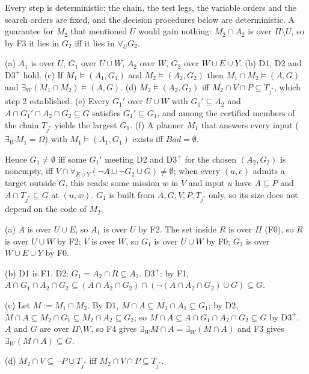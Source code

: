 \documentclass[10pt]{article}
\newcommand{\sect}[1]{\par\smallskip{\large\bfseries #1}\par\smallskip}
\newcommand{\ex}{\exists}
\newcommand{\fa}{\forall}
\newcommand{\Dthree}{\mathrm{D3}^{+}}
\begin{document}
Every step is deterministic: the chain, the test legs, the variable orders and the search orders are fixed, and the decision procedures below are deterministic. A guarantee for $M_2$ that mentioned $U$ would gain nothing: $M_2\cap A_2$ is over $\Pi\setminus U$, so by F3 it lies in $G_2$ iff it lies in $\fa_U G_2$.

\sect{3\quad Theorem}

(a) $A_1$ is over $U$, $G_1$ over $U\cup W$, $A_2$ over $W$, $G_2$ over $W\cup E\cup Y$. (b) D1, D2 and $\Dthree$ hold. (c) If $M_1\models(A_1,G_1)$ and $M_2\models(A_2,G_2)$ then $M_1\cap M_2\models(A,G)$ and $\ex_W(M_1\cap M_2)\models(A,G)$. (d) $M_2\models(A_2,G_2)$ iff $M_2\cap V\cap P\subseteq T_{j^*}$, which step 2 established. (e) Every $G_1'$ over $U\cup W$ with $G_1'\subseteq A_2$ and $A\cap G_1'\cap A_2\cap G_2\subseteq G$ satisfies $G_1'\subseteq G_1$, and among the certified members of the chain $T_{j^*}$ yields the largest $G_1$. (f) A planner $M_1$ that answers every input ($\ex_W M_1=\Omega$) with $M_1\models(A_1,G_1)$ exists iff $\mathit{Bad}=\emptyset$.

Hence $G_1\neq\emptyset$ iff some $G_1'$ meeting D2 and $\Dthree$ for the chosen $(A_2,G_2)$ is nonempty, iff $V\cap\fa_{E\cup Y}(\lnot A\cup\lnot G_2\cup G)\neq\emptyset$; when every $(u,e)$ admits a target outside $G$, this reads: some mission $w$ in $V$ and input $u$ have $A\subseteq P$ and $A\cap T_{j^*}\subseteq G$ at $(u,w)$. $G_1$ is built from $A,G,V,P,T_{j^*}$ only, so its size does not depend on the code of $M_2$.

\sect{4\quad Proof}

(a) $A$ is over $U\cup E$, so $A_1$ is over $U$ by F2. The set inside $R$ is over $\Pi$ (F0), so $R$ is over $U\cup W$ by F2; $V$ is over $W$, so $G_1$ is over $U\cup W$ by F0; $G_2$ is over $W\cup E\cup Y$ by F0.

(b) D1 is F1. D2: $G_1=A_2\cap R\subseteq A_2$. $\Dthree$: by F1, $A\cap G_1\cap A_2\cap G_2\subseteq(A\cap A_2\cap G_2)\cap(\lnot(A\cap A_2\cap G_2)\cup G)\subseteq G$.

(c) Let $M:=M_1\cap M_2$. By D1, $M\cap A\subseteq M_1\cap A_1\subseteq G_1$; by D2, $M\cap A\subseteq M_2\cap G_1\subseteq M_2\cap A_2\subseteq G_2$; so $M\cap A\subseteq A\cap G_1\cap A_2\cap G_2\subseteq G$ by $\Dthree$. $A$ and $G$ are over $\Pi\setminus W$, so F4 gives $\ex_W M\cap A=\ex_W(M\cap A)$ and F3 gives $\ex_W(M\cap A)\subseteq G$.

(d) $M_2\cap V\subseteq\lnot P\cup T_{j^*}$ iff $M_2\cap V\cap P\subseteq T_{j^*}$.
\end{document}
